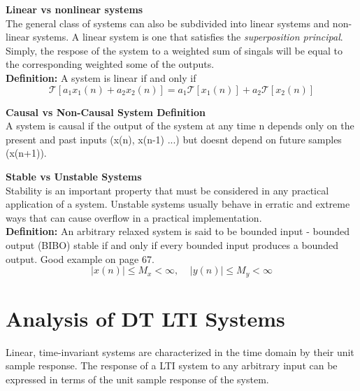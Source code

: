 \documentclass{article} %
\begin{document}
	\textbf{Linear vs nonlinear systems} \\
	The general class of systems can also be subdivided into linear systems and non-linear systems. A linear system is one that satisfies the \textit{superposition principal}. Simply, the respose of the system to a weighted sum of singals will be equal to the corresponding weighted some of the outputs.\\
	\textbf{Definition:} A system is linear if and only if 
	\begin{equation}
 	\mathcal{T}[a_1x_1(n) + a_2x_2(n)] = a_1\mathcal{T}[x_1(n)] + a_2\mathcal{T}[x_2(n)]
	\end{equation}
	
	\textbf{Causal vs Non-Causal System Definition} \\
	A system is causal if the  output of the system at any time n depends only on the present and past inputs (x(n), x(n-1) ...) but doesnt depend on future samples (x(n+1)). 
	
	\textbf{Stable vs Unstable Systems} \\
	Stability is an important property that must be considered in any practical application of a system. Unstable systems usually behave in erratic and extreme ways that can cause overflow in a practical implementation.\\
	\textbf{Definition:} An arbitrary relaxed system is said to be bounded input - bounded output (BIBO) stable if and only if every bounded input produces a bounded output. Good example on page 67.
	\begin{equation}
 	|x(n)| \le M_x < \infty, \;\;\;\; |y(n)| \le M_y < \infty
	\end{equation}
	
	\section{Analysis of DT LTI Systems}
	Linear, time-invariant systems are characterized in the time domain by their unit sample response. The response of a LTI system to any arbitrary input can be expressed  in terms of the unit sample response of the system.
\end{document}
